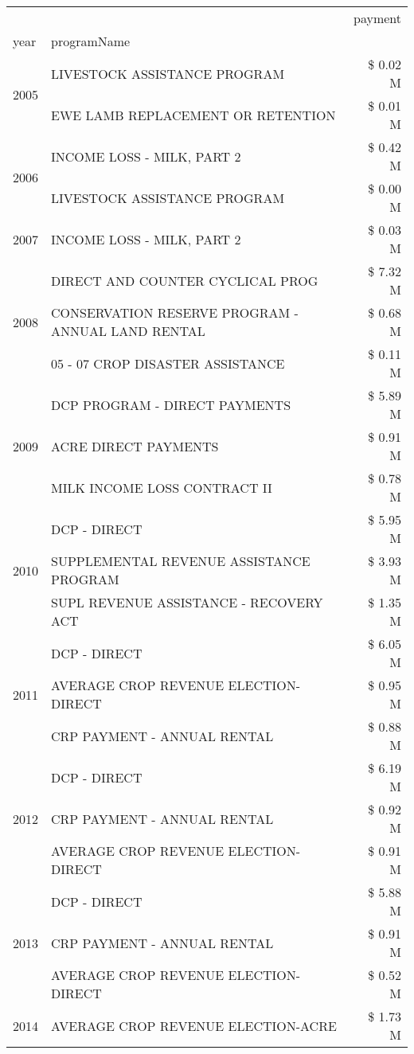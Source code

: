 \begin{tabular}{llr}
\toprule
 &  & payment \\
year & programName &  \\
\midrule
\multirow[t]{2}{*}{2005} & LIVESTOCK ASSISTANCE PROGRAM & \$ 0.02 M \\
 & EWE LAMB REPLACEMENT OR RETENTION & \$ 0.01 M \\
\cline{1-3}
\multirow[t]{2}{*}{2006} & INCOME LOSS - MILK, PART 2 & \$ 0.42 M \\
 & LIVESTOCK ASSISTANCE PROGRAM & \$ 0.00 M \\
\cline{1-3}
2007 & INCOME LOSS - MILK, PART 2 & \$ 0.03 M \\
\cline{1-3}
\multirow[t]{3}{*}{2008} & DIRECT AND COUNTER CYCLICAL PROG & \$ 7.32 M \\
 & CONSERVATION RESERVE PROGRAM - ANNUAL LAND RENTAL & \$ 0.68 M \\
 & 05 - 07 CROP DISASTER ASSISTANCE & \$ 0.11 M \\
\cline{1-3}
\multirow[t]{3}{*}{2009} & DCP PROGRAM - DIRECT PAYMENTS & \$ 5.89 M \\
 & ACRE DIRECT PAYMENTS & \$ 0.91 M \\
 & MILK INCOME LOSS CONTRACT II & \$ 0.78 M \\
\cline{1-3}
\multirow[t]{3}{*}{2010} & DCP - DIRECT & \$ 5.95 M \\
 & SUPPLEMENTAL REVENUE ASSISTANCE PROGRAM & \$ 3.93 M \\
 & SUPL REVENUE ASSISTANCE - RECOVERY ACT & \$ 1.35 M \\
\cline{1-3}
\multirow[t]{3}{*}{2011} & DCP - DIRECT & \$ 6.05 M \\
 & AVERAGE CROP REVENUE ELECTION-DIRECT & \$ 0.95 M \\
 & CRP PAYMENT - ANNUAL RENTAL & \$ 0.88 M \\
\cline{1-3}
\multirow[t]{3}{*}{2012} & DCP - DIRECT & \$ 6.19 M \\
 & CRP PAYMENT - ANNUAL RENTAL & \$ 0.92 M \\
 & AVERAGE CROP REVENUE ELECTION-DIRECT & \$ 0.91 M \\
\cline{1-3}
\multirow[t]{3}{*}{2013} & DCP - DIRECT & \$ 5.88 M \\
 & CRP PAYMENT - ANNUAL RENTAL & \$ 0.91 M \\
 & AVERAGE CROP REVENUE ELECTION-DIRECT & \$ 0.52 M \\
\cline{1-3}
\multirow[t]{3}{*}{2014} & AVERAGE CROP REVENUE ELECTION-ACRE & \$ 1.73 M \\

\end{tabular}
